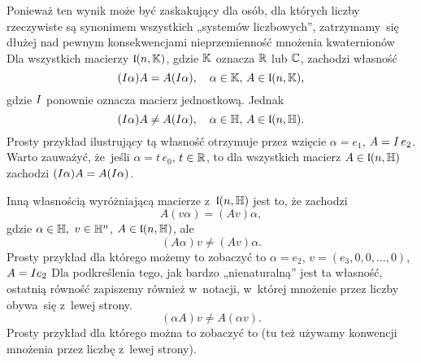 \documentclass[a4paper,11pt]{article}
\begin{document}
Ponieważ ten wynik może być zaskakujący dla osób, dla których liczby
rzeczywiste są synonimem wszystkich „systemów liczbowych”, zatrzymamy~się
dłużej nad pewnym konsekwencjami nieprzemienność mnożenia kwaternionów Dla
wszystkich macierzy $\mathfrak{l}( n, \mathbb{K} )$, gdzie $\mathbb{K}$ oznacza $\mathbb{R}$ lub
$\mathbb{C}$, zachodzi własność
\begin{equation}
  \label{eq:Wojtynski-49}
  ( I \alpha ) A = A ( I \alpha ), \quad
  \alpha \in \mathbb{K}, \, A \in \mathfrak{l}( n, \mathbb{K} ),
\end{equation}
gdzie $I$ ponownie oznacza macierz jednostkową. Jednak
\begin{equation}
  \label{eq:Wojtynski-37}
  ( I \alpha ) A \neq A ( I \alpha ), \quad
  \alpha \in \mathbb{H}, \, A \in \mathfrak{l}( n, \mathbb{H} ).
\end{equation}
Prosty przykład ilustrujący tą własność otrzymuje przez wzięcie
$\alpha = e_{ 1 }$, $A = I \, e_{ 2 }$. Warto zauważyć, że~jeśli
$\alpha = t \, e_{ 0 }$, $t \in \mathbb{R}$, to dla wszystkich macierz
$A \in \mathfrak{l}( n, \mathbb{H} )$ zachodzi $( I \alpha ) A = A ( I \alpha )$.

Inną własnością wyróżniającą macierze z~$\mathfrak{l}( n, \mathbb{H} )$ jest to, że
zachodzi
\begin{equation}
  \label{eq:Wojtynski-38}
  A ( v \alpha ) = ( A v ) \alpha,
\end{equation}
gdzie $\alpha \in \mathbb{H},$ $v \in \mathbb{H}^{ n }$, $A \in \mathfrak{l}( n, \mathbb{H} )$, ale
\begin{equation}
  \label{eq:Wojtynski-39}
  ( A \alpha ) v \neq ( A v ) \alpha.
\end{equation}
Prosty przykład dla którego możemy to zobaczyć to $\alpha = e_{ 2 }$,
$v = ( e_{ 3 }, 0, 0, \ldots, 0 )$, $A = I e_{ 2 }$
Dla podkreślenia tego, jak bardzo „nienaturalną” jest ta własność, ostatnią
równość zapiszemy również w~notacji, w~której mnożenie przez liczby obywa~się
z~lewej strony.
\begin{equation}
  \label{eq:Wojtynski-40}
  ( \alpha A ) v \neq A ( \alpha v ).
\end{equation}
Prosty przykład dla którego można to zobaczyć to  (tu też używamy
konwencji mnożenia przez liczbę z~lewej strony).
\end{document}
